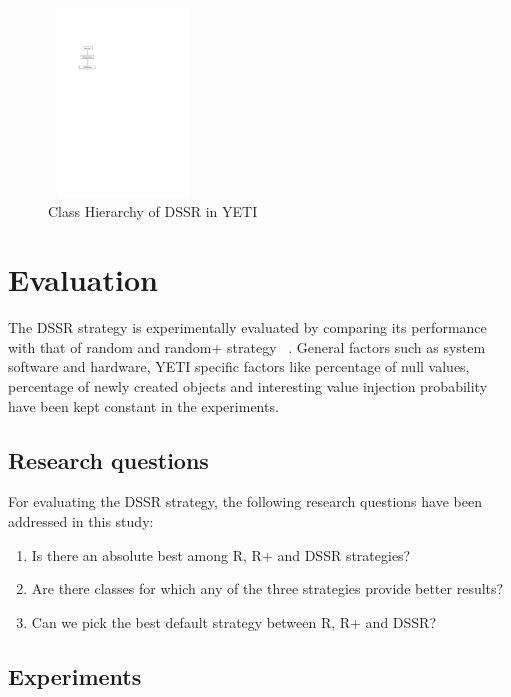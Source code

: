 \begin{figure}[h]
\centering
\includegraphics[width=4cm,height=5cm]{chapter4/hierarchy.pdf}
\caption{Class Hierarchy of DSSR in YETI}
\label{fig:hierarchyofDSSR}
\end{figure}







\section{Evaluation}\label{sec:eval}

The DSSR strategy is experimentally evaluated by comparing its performance with that of random and random+ strategy ~\cite{Leitner2007}. General factors such as system software and hardware, YETI specific factors like percentage of null values, percentage of newly created objects and interesting value injection probability have been kept constant in the experiments.

\subsection{Research questions}
For evaluating the DSSR strategy, the following research questions have been addressed in this study:
\begin{enumerate}
\item Is there an absolute best among R, R+ and DSSR strategies?
\item Are there classes for which any of the three strategies provide better results?
\item Can we pick the best default strategy between R, R+ and DSSR?
\end{enumerate}



\subsection{Experiments}

